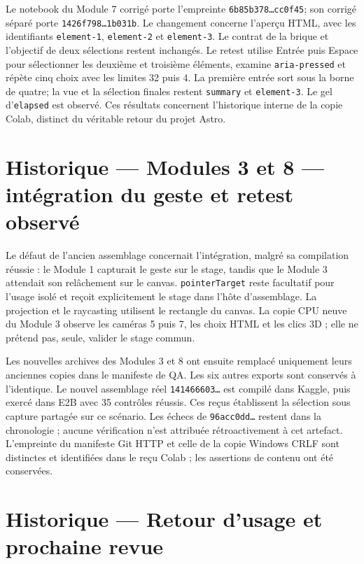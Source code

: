 \documentclass[
  canadien,
  11pt,
  a4paper,
]{report}
\begin{document}
Le notebook du Module 7 corrigé porte l'empreinte
\texttt{6b85b378…cc0f45}; son corrigé séparé porte
\texttt{1426f798…1b031b}. Le changement concerne l'aperçu HTML, avec les
identifiants \texttt{element-1}, \texttt{element-2} et
\texttt{element-3}. Le contrat de la brique et l'objectif de deux
sélections restent inchangés. Le retest utilise Entrée puis Espace pour
sélectionner les deuxième et troisième éléments, examine
\texttt{aria-pressed} et répète cinq choix avec les limites 32 puis 4.
La première entrée sort sous la borne de quatre; la vue et la sélection
finales restent \texttt{summary} et \texttt{element-3}. Le gel
d'\texttt{elapsed} est observé. Ces résultats concernent l'historique
interne de la copie Colab, distinct du véritable retour du projet Astro.

\section{Historique --- Modules 3 et 8 --- intégration du geste et
retest
observé}\label{historique-modules-3-et-8-intuxe9gration-du-geste-et-retest-observuxe9}

Le défaut de l'ancien assemblage concernait l'intégration, malgré sa
compilation réussie : le Module 1 capturait le geste sur le stage,
tandis que le Module 3 attendait son relâchement sur le canvas.
\texttt{pointer\allowbreak{}Target} reste facultatif pour l'usage isolé et reçoit
explicitement le stage dans l'hôte d'assemblage. La projection et le
raycasting utilisent le rectangle du canvas. La copie CPU neuve du
Module 3 observe les caméras 5 puis 7, les choix HTML et les clics 3D ;
elle ne prétend pas, seule, valider le stage commun.

Les nouvelles archives des Modules 3 et 8 ont ensuite remplacé
uniquement leurs anciennes copies dans le manifeste de QA. Les six
autres exports sont conservés à l'identique. Le nouvel assemblage réel
\texttt{141466603…} est compilé dans Kaggle, puis exercé dans E2B avec
35 contrôles réussis. Ces reçus établissent la sélection sous capture
partagée sur ce scénario. Les échecs de \texttt{96acc0dd…} restent dans
la chronologie ; aucune vérification n'est attribuée rétroactivement à
cet artefact. L'empreinte du manifeste Git HTTP et celle de la copie
Windows CRLF sont distinctes et identifiées dans le reçu Colab ; les
assertions de contenu ont été conservées.

\section{Historique --- Retour d'usage et prochaine
revue}\label{historique-retour-dusage-et-prochaine-revue}
\end{document}
